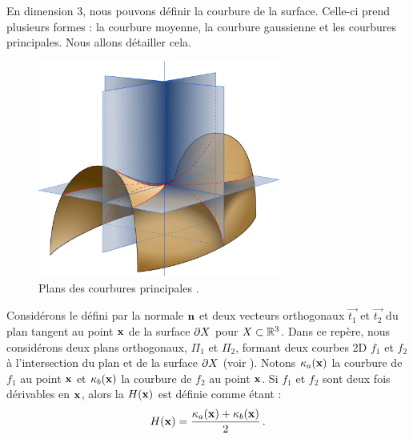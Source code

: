 %     


En dimension 3, nous pouvons définir la courbure de la surface. Celle-ci prend
plusieurs formes : la courbure moyenne, la courbure gaussienne et les courbures
principales. Nous allons détailler cela.

\begin{figure}[ht]{
    \begin{center}
    \includegraphics[width=8cm]{figures/Minimal_surface_curvature_planes-fr}
    \end{center}}
    \caption{Plans des courbures principales \cite{WikipediaCurv}.\label{fig:wiki-surv}}
\end{figure}

Considérons le  défini par la normale $\mathbf{n}$ et
deux vecteurs orthogonaux $\vec{t_1}$ et $\vec{t_2}$ du plan tangent au point
$\mathbf{x}$ de la surface $\partial X$ pour $X \subset \mathbb{R}^3$. Dans ce repère, nous
considérons deux plans orthogonaux, $\Pi_1$ et $\Pi_2$, formant deux courbes 2D
$f_1$ et $f_2$ à l'intersection du plan et de la surface $\partial X$ (voir
). Notons $\kappa_{a}(\mathbf{x})$ la courbure de $f_1$ au
point $\mathbf{x}$ et $\kappa_{b}(\mathbf{x})$ la courbure de $f_2$ au point $\mathbf{x}$. Si
$f_1$ et $f_2$ sont deux fois dérivables en $\mathbf{x}$, alors la  $H(\mathbf{x})$ est définie comme étant :
%
\begin{equation}
  H(\mathbf{x}) = \frac{\kappa_{a}(\mathbf{x}) + \kappa_{b}(\mathbf{x})}{2} \,.
\end{equation}

